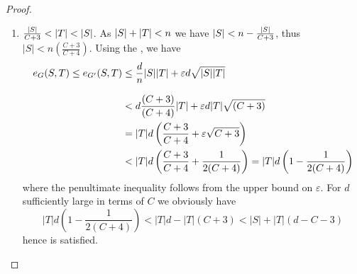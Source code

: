 \documentclass[11pt]{article}
\begin{document}
\begin{proof}
\begin{enumerate}
\item{
$ \frac{\Size{S}}{C+3} < \Size{T} < \Size{S}$. As $\Size{S} + \Size{T} < n$ we have $\Size{S} < n - \frac{\Size{S}}{C+3}$, thus $|S| < n\left(\frac{C+3}{C+4}\right)$.
Using the , we have
\begin{align}
\CutEdges{S}{T}{G} \le \CutEdges{S}{T}{G'} &\le \frac{d}{n}\Size{S}\Size{T} + \epsilon d \sqrt{\Size{S}\Size{T}} \nonumber	\\[8pt]
&< d\frac{(C+3)}{(C+4)}\Size{T} + \epsilon d \Size{T}\sqrt{(C+3)} \nonumber  \\
&= |T|d \left( \frac{C+3}{C+4} + \varepsilon \sqrt{C+3} \right) \nonumber \\
&< |T|d\left( \frac{C+3}{C+4} + \frac{1}{2(C+4)} \right) = |T|d\left( 1 - \frac{1}{2(C+4)}\right) \nonumber
\end{align}
where the penultimate inequality follows from the upper bound on $\varepsilon$. For $d$ sufficiently large in terms of $C$ we obviously have
$$
    |T|d \left(1 - \frac{1}{2(C+4)}\right) < |T|d - |T|(C + 3) < |S| + |T|(d - C - 3)
$$
hence \label{eq:to-show-3} is satisfied.


  }
  
\end{enumerate}
\end{proof}  
\end{document}
